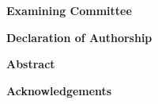 \pagestyle{empty}





\pagestyle{plain}
\setcounter{page}{2}

\cleardoublepage %



\begin{center}\textbf{Examining Committee}\end{center}


\cleardoublepage


\begin{center}\textbf{Declaration of Authorship}\end{center}


\cleardoublepage


\begin{center}\textbf{Abstract}\end{center}


\cleardoublepage


\begin{center}\textbf{Acknowledgements}\end{center}


\cleardoublepage


%

